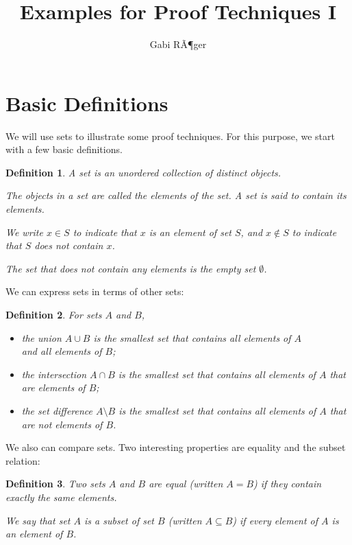 \documentclass{article}
\title{Examples for Proof Techniques I}
\author{Gabi RÃ¶ger}
\date{}
\newtheorem{definition}{Definition}
\begin{document}
\maketitle

\section{Basic Definitions}
We will use sets to illustrate some proof techniques. For this purpose, we start with a few basic definitions.

\begin{definition}

	A \emph{set} is an unordered collection of distinct objects.
	\smallskip

	The objects in a set are called the \emph{elements} of the set. A set is said
	to \emph{contain} its elements.\smallskip

	We write $x\in S$ to indicate that $x$ is an element of set $S$, and $x\notin
		S$ to indicate that $S$ does not contain $x$.
	\smallskip

	The set that does not contain any elements is the \emph{empty set} $\emptyset$.
\end{definition}

We can express sets in terms of other sets:

\begin{definition}
	For sets $A$ and $B$,
	\begin{itemize}
		\item the \emph{union} $A\cup B$ is the smallest set that contains all
		      elements of $A$\\and all elements of $B$;
		\item the \emph{intersection} $A\cap B$ is the smallest set that contains all
		      elements of $A$ that are elements of $B$;
		\item the \emph{set difference} $A\setminus B$ is the smallest set that
		      contains all elements of $A$ that are \emph{not} elements of $B$.
	\end{itemize}
\end{definition}

We also can compare sets. Two interesting properties are equality and the subset relation:

\begin{definition}
	Two sets $A$ and $B$ are \emph{equal} (written $A = B$) if they contain exactly
	the same elements.
	\medskip

	We say that set $A$ is a \emph{subset} of set $B$ (written $A\subseteq B$) if
	every element of $A$ is an element of $B$.
\end{definition}
\end{document}
